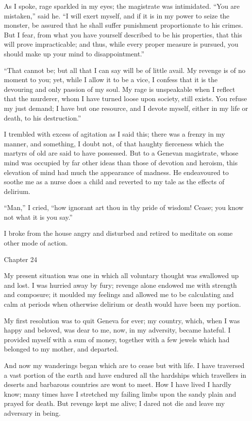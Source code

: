 \documentclass[12pt,openright]{book}
\begin{document}
As I spoke, rage sparkled in my eyes; the magistrate was intimidated. “You are mistaken,” said he. “I will exert myself, and if it is in my power to seize the monster, be assured that he shall suffer punishment proportionate to his crimes. But I fear, from what you have yourself described to be his properties, that this will prove impracticable; and thus, while every proper measure is pursued, you should make up your mind to disappointment.”

“That cannot be; but all that I can say will be of little avail. My revenge is of no moment to you; yet, while I allow it to be a vice, I confess that it is the devouring and only passion of my soul. My rage is unspeakable when I reflect that the murderer, whom I have turned loose upon society, still exists. You refuse my just demand; I have but one resource, and I devote myself, either in my life or death, to his destruction.”

I trembled with excess of agitation as I said this; there was a frenzy in my manner, and something, I doubt not, of that haughty fierceness which the martyrs of old are said to have possessed. But to a Genevan magistrate, whose mind was occupied by far other ideas than those of devotion and heroism, this elevation of mind had much the appearance of madness. He endeavoured to soothe me as a nurse does a child and reverted to my tale as the effects of delirium.

“Man,” I cried, “how ignorant art thou in thy pride of wisdom! Cease; you know not what it is you say.”

I broke from the house angry and disturbed and retired to meditate on some other mode of action.

Chapter 24

My present situation was one in which all voluntary thought was swallowed up and lost. I was hurried away by fury; revenge alone endowed me with strength and composure; it moulded my feelings and allowed me to be calculating and calm at periods when otherwise delirium or death would have been my portion.

My first resolution was to quit Geneva for ever; my country, which, when I was happy and beloved, was dear to me, now, in my adversity, became hateful. I provided myself with a sum of money, together with a few jewels which had belonged to my mother, and departed.

And now my wanderings began which are to cease but with life. I have traversed a vast portion of the earth and have endured all the hardships which travellers in deserts and barbarous countries are wont to meet. How I have lived I hardly know; many times have I stretched my failing limbs upon the sandy plain and prayed for death. But revenge kept me alive; I dared not die and leave my adversary in being.
\end{document}
